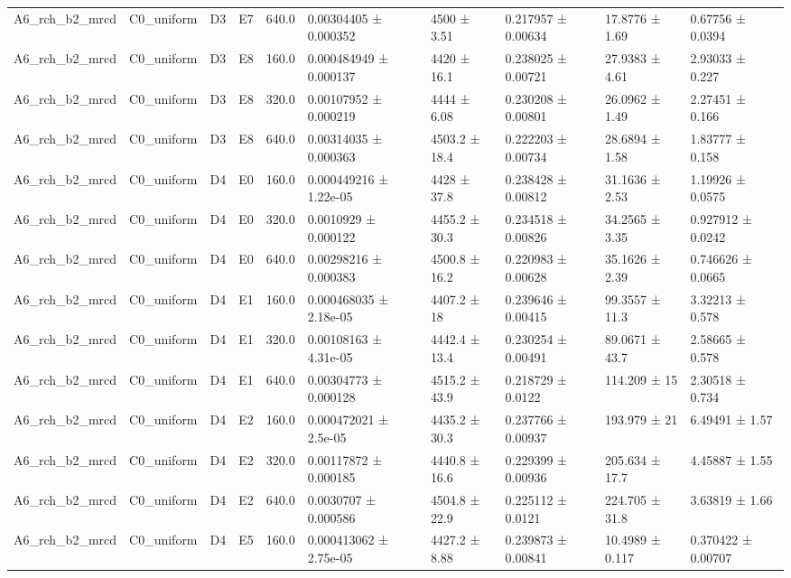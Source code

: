 \begin{table}
\begin{tabular}{llllllllll}
A6\_rch\_b2\_mrcd & C0\_uniform & D3 & E7 & 640.0 & 0.00304405 ± 0.000352 & 4500 ± 3.51 & 0.217957 ± 0.00634 & 17.8776 ± 1.69 & 0.67756 ± 0.0394 \\
A6\_rch\_b2\_mrcd & C0\_uniform & D3 & E8 & 160.0 & 0.000484949 ± 0.000137 & 4420 ± 16.1 & 0.238025 ± 0.00721 & 27.9383 ± 4.61 & 2.93033 ± 0.227 \\
A6\_rch\_b2\_mrcd & C0\_uniform & D3 & E8 & 320.0 & 0.00107952 ± 0.000219 & 4444 ± 6.08 & 0.230208 ± 0.00801 & 26.0962 ± 1.49 & 2.27451 ± 0.166 \\
A6\_rch\_b2\_mrcd & C0\_uniform & D3 & E8 & 640.0 & 0.00314035 ± 0.000363 & 4503.2 ± 18.4 & 0.222203 ± 0.00734 & 28.6894 ± 1.58 & 1.83777 ± 0.158 \\
A6\_rch\_b2\_mrcd & C0\_uniform & D4 & E0 & 160.0 & 0.000449216 ± 1.22e-05 & 4428 ± 37.8 & 0.238428 ± 0.00812 & 31.1636 ± 2.53 & 1.19926 ± 0.0575 \\
A6\_rch\_b2\_mrcd & C0\_uniform & D4 & E0 & 320.0 & 0.0010929 ± 0.000122 & 4455.2 ± 30.3 & 0.234518 ± 0.00826 & 34.2565 ± 3.35 & 0.927912 ± 0.0242 \\
A6\_rch\_b2\_mrcd & C0\_uniform & D4 & E0 & 640.0 & 0.00298216 ± 0.000383 & 4500.8 ± 16.2 & 0.220983 ± 0.00628 & 35.1626 ± 2.39 & 0.746626 ± 0.0665 \\
A6\_rch\_b2\_mrcd & C0\_uniform & D4 & E1 & 160.0 & 0.000468035 ± 2.18e-05 & 4407.2 ± 18 & 0.239646 ± 0.00415 & 99.3557 ± 11.3 & 3.32213 ± 0.578 \\
A6\_rch\_b2\_mrcd & C0\_uniform & D4 & E1 & 320.0 & 0.00108163 ± 4.31e-05 & 4442.4 ± 13.4 & 0.230254 ± 0.00491 & 89.0671 ± 43.7 & 2.58665 ± 0.578 \\
A6\_rch\_b2\_mrcd & C0\_uniform & D4 & E1 & 640.0 & 0.00304773 ± 0.000128 & 4515.2 ± 43.9 & 0.218729 ± 0.0122 & 114.209 ± 15 & 2.30518 ± 0.734 \\
A6\_rch\_b2\_mrcd & C0\_uniform & D4 & E2 & 160.0 & 0.000472021 ± 2.5e-05 & 4435.2 ± 30.3 & 0.237766 ± 0.00937 & 193.979 ± 21 & 6.49491 ± 1.57 \\
A6\_rch\_b2\_mrcd & C0\_uniform & D4 & E2 & 320.0 & 0.00117872 ± 0.000185 & 4440.8 ± 16.6 & 0.229399 ± 0.00936 & 205.634 ± 17.7 & 4.45887 ± 1.55 \\
A6\_rch\_b2\_mrcd & C0\_uniform & D4 & E2 & 640.0 & 0.0030707 ± 0.000586 & 4504.8 ± 22.9 & 0.225112 ± 0.0121 & 224.705 ± 31.8 & 3.63819 ± 1.66 \\
A6\_rch\_b2\_mrcd & C0\_uniform & D4 & E5 & 160.0 & 0.000413062 ± 2.75e-05 & 4427.2 ± 8.88 & 0.239873 ± 0.00841 & 10.4989 ± 0.117 & 0.370422 ± 0.00707 \\

\end{tabular}
\end{table}
